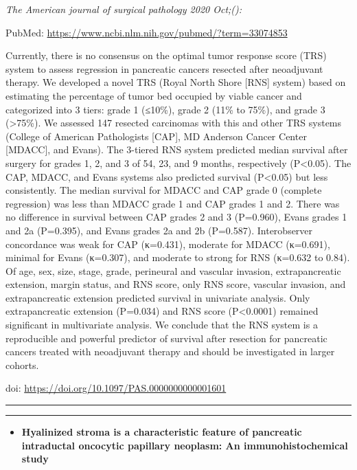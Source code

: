 \documentclass[
]{article}
\providecommand{\tightlist}{%
  \setlength{\itemsep}{0pt}\setlength{\parskip}{0pt}}
\begin{document}
\emph{The American journal of surgical pathology 2020 Oct;():}

PubMed: \url{https://www.ncbi.nlm.nih.gov/pubmed/?term=33074853}

Currently, there is no consensus on the optimal tumor response score
(TRS) system to assess regression in pancreatic cancers resected after
neoadjuvant therapy. We developed a novel TRS (Royal North Shore
{[}RNS{]} system) based on estimating the percentage of tumor bed
occupied by viable cancer and categorized into 3 tiers: grade 1 (≤10\%),
grade 2 (11\% to 75\%), and grade 3 (\textgreater75\%). We assessed 147
resected carcinomas with this and other TRS systems (College of American
Pathologists {[}CAP{]}, MD Anderson Cancer Center {[}MDACC{]}, and
Evans). The 3-tiered RNS system predicted median survival after surgery
for grades 1, 2, and 3 of 54, 23, and 9 months, respectively
(P\textless0.05). The CAP, MDACC, and Evans systems also predicted
survival (P\textless0.05) but less consistently. The median survival for
MDACC and CAP grade 0 (complete regression) was less than MDACC grade 1
and CAP grades 1 and 2. There was no difference in survival between CAP
grades 2 and 3 (P=0.960), Evans grades 1 and 2a (P=0.395), and Evans
grades 2a and 2b (P=0.587). Interobserver concordance was weak for CAP
(κ=0.431), moderate for MDACC (κ=0.691), minimal for Evans (κ=0.307),
and moderate to strong for RNS (κ=0.632 to 0.84). Of age, sex, size,
stage, grade, perineural and vascular invasion, extrapancreatic
extension, margin status, and RNS score, only RNS score, vascular
invasion, and extrapancreatic extension predicted survival in univariate
analysis. Only extrapancreatic extension (P=0.034) and RNS score
(P\textless0.0001) remained significant in multivariate analysis. We
conclude that the RNS system is a reproducible and powerful predictor of
survival after resection for pancreatic cancers treated with neoadjuvant
therapy and should be investigated in larger cohorts.

doi: \url{https://doi.org/10.1097/PAS.0000000000001601}

\begin{center}\rule{0.5\linewidth}{0.5pt}\end{center}

\begin{center}\rule{0.5\linewidth}{0.5pt}\end{center}

\begin{itemize}
\tightlist
\item
  \textbf{Hyalinized stroma is a characteristic feature of pancreatic
  intraductal oncocytic papillary neoplasm: An immunohistochemical
  study}
\end{itemize}
\end{document}
